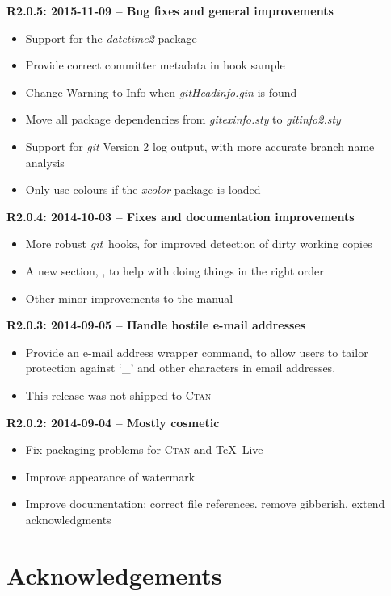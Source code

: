 \documentclass[a4paper,12pt,twoside,openany]{memoir}
\newcommand{\rpara}[1]{\par\noindent\textbf{#1}\,}
\newcommand{\sfit}[1]{\textit{#1}}
\newcommand{\git}{\sfit{git}}
\begin{document}
\rpara{R2.0.5: 2015-11-09 -- Bug fixes and general improvements}
\begin{itemize}
\item Support for the \sfit{datetime2} package
\item Provide correct committer metadata in hook sample
\item Change Warning to Info when \sfit{gitHeadinfo.gin} is found
\item Move all package dependencies from \sfit{gitexinfo.sty} to \sfit{gitinfo2.sty}
\item Support for \git{} Version 2 log output, with more accurate branch name analysis
\item Only use colours if the \sfit{xcolor} package is loaded
\end{itemize}

\rpara{R2.0.4: 2014-10-03 -- Fixes and documentation improvements}
\begin{itemize}
\item More robust \git\ hooks,
for improved detection of dirty working copies
\item A new section, \textit{},
to help with doing things in the right order
\item Other minor improvements to the manual
\end{itemize}

\rpara{R2.0.3: 2014-09-05 -- Handle hostile e-mail addresses}
\begin{itemize}
\item Provide an e-mail address wrapper command,
to allow users to tailor protection
against `\_' and other characters in email addresses.
\item This release was not shipped to \textsc{Ctan}
\end{itemize}

\rpara{R2.0.2: 2014-09-04 -- Mostly cosmetic}
\begin{itemize}
\item Fix packaging problems for \textsc{Ctan} and \TeX{}~Live
\item Improve appearance of watermark
\item Improve documentation: correct file references. remove gibberish, extend acknowledgments
\end{itemize}

\clearpage
\section{Acknowledgements}
\end{document}
